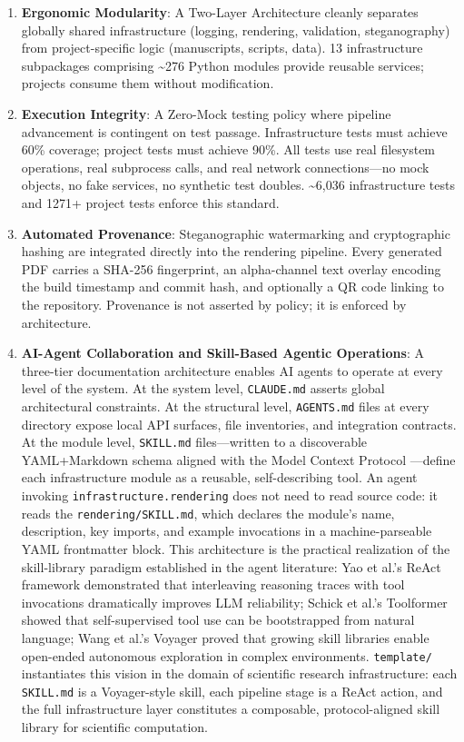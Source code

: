 \documentclass[
]{article}
\begin{document}
\begin{enumerate}
\def\labelenumi{\arabic{enumi}.}
\item
  \textbf{Ergonomic Modularity}: A Two-Layer Architecture cleanly
  separates globally shared infrastructure (logging, rendering,
  validation, steganography) from project-specific logic (manuscripts,
  scripts, data). 13 infrastructure subpackages comprising
  \textasciitilde276 Python modules provide reusable services; projects
  consume them without modification.
\item
  \textbf{Execution Integrity}: A Zero-Mock testing policy where
  pipeline advancement is contingent on test passage. Infrastructure
  tests must achieve 60\% coverage; project tests must achieve 90\%. All
  tests use real filesystem operations, real subprocess calls, and real
  network connections---no mock objects, no fake services, no synthetic
  test doubles. \textasciitilde6,036 infrastructure tests and 1271+
  project tests enforce this standard.
\item
  \textbf{Automated Provenance}: Steganographic watermarking and
  cryptographic hashing are integrated directly into the rendering
  pipeline. Every generated PDF carries a SHA-256 fingerprint, an
  alpha-channel text overlay encoding the build timestamp and commit
  hash, and optionally a QR code linking to the repository. Provenance
  is not asserted by policy; it is enforced by architecture.
\item
  \textbf{AI-Agent Collaboration and Skill-Based Agentic Operations}: A
  three-tier documentation architecture enables AI agents to operate at
  every level of the system. At the system level, \texttt{CLAUDE.md}
  asserts global architectural constraints. At the structural level,
  \texttt{AGENTS.md} files at every directory expose local API surfaces,
  file inventories, and integration contracts. At the module level,
  \texttt{SKILL.md} files---written to a discoverable YAML+Markdown
  schema aligned with the Model Context Protocol
  \citep{anthropic2024mcp}---define each infrastructure module as a
  reusable, self-describing tool. An agent invoking
  \texttt{infrastructure.rendering} does not need to read source code:
  it reads the \texttt{rendering/SKILL.md}, which declares the module's
  name, description, key imports, and example invocations in a
  machine-parseable YAML frontmatter block. This architecture is the
  practical realization of the skill-library paradigm established in the
  agent literature: Yao et al.'s ReAct framework \citep{yao2023react}
  demonstrated that interleaving reasoning traces with tool invocations
  dramatically improves LLM reliability; Schick et al.'s Toolformer
  \citep{schick2023toolformer} showed that self-supervised tool use can
  be bootstrapped from natural language; Wang et al.'s Voyager
  \citep{wang2023voyager} proved that growing skill libraries enable
  open-ended autonomous exploration in complex environments.
  \texttt{template/} instantiates this vision in the domain of
  scientific research infrastructure: each \texttt{SKILL.md} is a
  Voyager-style skill, each pipeline stage is a ReAct action, and the
  full infrastructure layer constitutes a composable, protocol-aligned
  skill library for scientific computation.
\end{enumerate}
\end{document}
